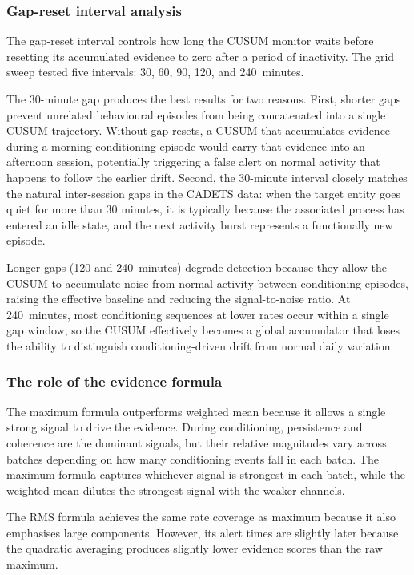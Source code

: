 \documentclass[10pt,twocolumn]{article}
\begin{document}
\subsubsection{Gap-reset interval analysis}

The gap-reset interval controls how long the CUSUM monitor waits before
resetting its accumulated evidence to zero after a period of inactivity.
The grid sweep tested five intervals: 30, 60, 90, 120, and 240~minutes.

The 30-minute gap produces the best results for two reasons.  First,
shorter gaps prevent unrelated behavioural episodes from being
concatenated into a single CUSUM trajectory.  Without gap resets, a
CUSUM that accumulates evidence during a morning conditioning episode
would carry that evidence into an afternoon session, potentially
triggering a false alert on normal activity that happens to follow the
earlier drift.  Second, the 30-minute interval closely matches the
natural inter-session gaps in the CADETS data: when the target entity
goes quiet for more than 30 minutes, it is typically because the
associated process has entered an idle state, and the next activity
burst represents a functionally new episode.

Longer gaps (120 and 240~minutes) degrade detection because they allow
the CUSUM to accumulate noise from normal activity between conditioning
episodes, raising the effective baseline and reducing the signal-to-noise
ratio.  At 240~minutes, most conditioning sequences at lower rates occur
within a single gap window, so the CUSUM effectively becomes a global
accumulator that loses the ability to distinguish conditioning-driven
drift from normal daily variation.

\subsubsection{The role of the evidence formula}

The maximum formula outperforms weighted mean because it allows a single
strong signal to drive the evidence.  During conditioning, persistence
and coherence are the dominant signals, but their relative magnitudes
vary across batches depending on how many conditioning events fall in each
batch.  The maximum formula captures whichever signal is strongest in each
batch, while the weighted mean dilutes the strongest signal with the weaker
channels.

The RMS formula achieves the same rate coverage as maximum because it also
emphasises large components.  However, its alert times are slightly later
because the quadratic averaging produces slightly lower evidence scores
than the raw maximum.
\end{document}
